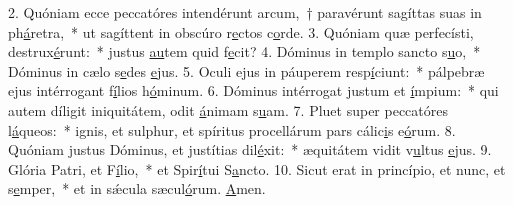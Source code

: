 2. Quóniam ecce peccatóres intendérunt arcum,~† paravérunt sagíttas suas in ph\uline{á}retra,~* ut sagíttent in obscúro r\uline{e}ctos c\uline{o}rde.
3. Quóniam quæ perfecísti, destrux\uline{é}runt:~* justus \uline{au}tem quid f\uline{e}cit?
4. Dóminus in templo sancto s\uline{u}o,~* Dóminus in cælo s\uline{e}des \uline{e}jus.
5. Oculi ejus in páuperem resp\uline{í}ciunt:~* pálpebræ ejus intérrogant f\uline{í}lios h\uline{ó}minum.
6. Dóminus intérrogat justum et \uline{í}mpium:~* qui autem díligit iniquitátem, odit \uline{á}nimam s\uline{u}am.
7. Pluet super peccatóres l\uline{á}queos:~* ignis, et sulphur, et spíritus procellárum pars cálic\uline{i}s e\uline{ó}rum.
8. Quóniam justus Dóminus, et justítias dil\uline{é}xit:~* æquitátem vidit v\uline{u}ltus \uline{e}jus.
9. Glória Patri, et F\uline{í}lio,~* et Spir\uline{í}tui S\uline{a}ncto.
10. Sicut erat in princípio, et nunc, et s\uline{e}mper,~* et in sǽcula sæcul\uline{ó}rum. \uline{A}men.
